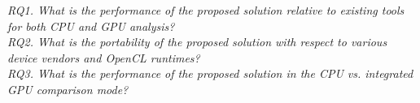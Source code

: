 \textit{RQ1. What is the performance of the proposed solution relative to existing tools for both CPU and GPU analysis?}\\

\textit{RQ2. What is the portability of the proposed solution with respect to various device vendors and OpenCL runtimes?}\\

\textit{RQ3. What is the performance of the proposed solution in the CPU vs. integrated GPU comparison mode?}\\



